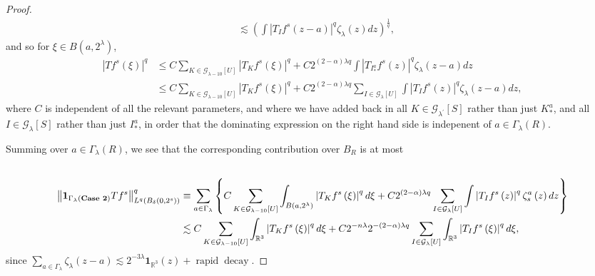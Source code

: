 \documentclass{amsart}%
\theoremstyle{plain}
\numberwithin{equation}{section}
\begin{document}
\begin{proof}
\begin{align*}
&  \lesssim\left(  \int\left\vert T_{I}f^{s}\left(  z-a\right)  \right\vert
^{q}\zeta_{\lambda}\left(  z\right)  dz\right)  ^{\frac{1}{q}},
\end{align*}
and so for $\xi\in B\left(  a,2^{\lambda}\right)  $,
\begin{align*}
\left\vert Tf^{s}\left(  \xi\right)  \right\vert ^{q}  &  \leq C\sum
_{K\in\mathcal{G}_{\lambda-10}\left[  U\right]  }\left\vert T_{K}f^{s}\left(
\xi\right)  \right\vert ^{q}+C2^{\left(  2-\alpha\right)  \lambda q}%
\int\left\vert T_{I_{\ast}^{a}}f^{s}\left(  z\right)  \right\vert ^{q}%
\zeta_{\lambda}\left(  z-a\right)  dz\\
&  \leq C\sum_{K\in\mathcal{G}_{\lambda-10}\left[  U\right]  }\left\vert
T_{K}f^{s}\left(  \xi\right)  \right\vert ^{q}+C2^{\left(  2-\alpha\right)
\lambda q}\sum_{I\in\mathcal{G}_{\lambda}\left[  U\right]  }\int\left\vert
T_{I}f^{s}\left(  z\right)  \right\vert ^{q}\zeta_{\lambda}\left(  z-a\right)
dz,
\end{align*}
where $C$ is independent of all the relevant parameters, and where we have
added back in all $K\in\mathcal{G}_{\lambda^{\prime}}\left[  S\right]  $
rather than just $K_{\ast}^{a}$, and all $I\in\mathcal{G}_{\lambda}\left[
S\right]  $ rather than just $I_{\ast}^{a}$, in order that the dominating
expression on the right hand side is indepenent of $a\in\Gamma_{\lambda
}\left(  R\right)  $.

Summing over $a\in\Gamma_{\lambda}\left(  R\right)  $, we see that the
corresponding contribution over $B_{R}$ is at most%
\begin{align}
& \label{contrib Case 2}\\
\left\Vert \mathbf{1}_{\Gamma_{\lambda}\left(  \text{\textbf{Case 2}}\right)
}Tf^{s}\right\Vert _{L^{q}\left(  B_{\delta}\left(  0,2^{s}\right)  \right)
}^{q}  &  \equiv\sum_{a\in\Gamma_{\lambda}}\left\{  C\sum_{K\in\mathcal{G}%
_{\lambda-10}\left[  U\right]  }\int_{B\left(  a,2^{\lambda}\right)
}\left\vert T_{K}f^{s}\left(  \xi\right)  \right\vert ^{q}d\xi+C2^{\left(
2-\alpha\right)  \lambda q}\sum_{I\in\mathcal{G}_{\lambda}\left[  U\right]
}\int\left\vert T_{I}f^{s}\left(  z\right)  \right\vert ^{q}\zeta_{s}%
^{a}\left(  z\right)  dz\right\} \nonumber\\
&  \lesssim C\sum_{K\in\mathcal{G}_{\lambda-10}\left[  U\right]  }%
\int_{\mathbb{R}^{3}}\left\vert T_{K}f^{s}\left(  \xi\right)  \right\vert
^{q}d\xi+C2^{-n\lambda}2^{-\left(  2-\alpha\right)  \lambda q}\sum
_{I\in\mathcal{G}_{\lambda}\left[  U\right]  }\int_{\mathbb{R}^{3}}\left\vert
T_{I}f^{s}\left(  \xi\right)  \right\vert ^{q}d\xi,\nonumber
\end{align}
since $\sum_{a\in\Gamma_{\lambda}}\zeta_{\lambda}\left(  z-a\right)
\lesssim2^{-3\lambda}\mathbf{1}_{\mathbb{R}^{3}}\left(  z\right)
+\operatorname*{rapid}\operatorname*{decay}$.


\end{proof}
\end{document}
